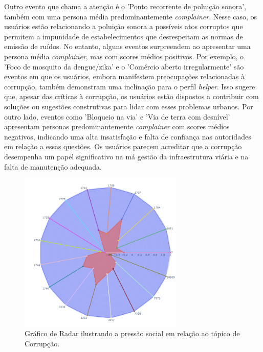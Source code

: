 Outro evento que chama a atenção é o 'Ponto recorrente de poluição sonora', também com uma persona média predominantemente \textit{complainer}. Nesse caso, os usuários estão relacionando a poluição sonora a possíveis atos corruptos que permitem a impunidade de estabelecimentos que desrespeitam as normas de emissão de ruídos. No entanto, alguns eventos surpreendem ao apresentar uma persona média \textit{complainer}, mas com scores médios positivos. Por exemplo, o 'Foco de mosquito da dengue/zika' e o 'Comércio aberto irregularmente' são eventos em que os usuários, embora manifestem preocupações relacionadas à corrupção, também demonstram uma inclinação para o perfil \textit{helper}. Isso sugere que, apesar das críticas à corrupção, os usuários estão dispostos a contribuir com soluções ou sugestões construtivas para lidar com esses problemas urbanos. Por outro lado, eventos como 'Bloqueio na via' e 'Via de terra com desnível' apresentam personas predominantemente \textit{complainer} com scores médios negativos, indicando uma alta insatisfação e falta de confiança nas autoridades em relação a essas questões. Os usuários parecem acreditar que a corrupção desempenha um papel significativo na má gestão da infraestrutura viária e na falta de manutenção adequada.

\begin{figure}[htb]
	\centering
	\includegraphics[width=0.7\textwidth]{images/social_barometer_corruption.png}
	\caption{Gráfico de Radar ilustrando a pressão social em relação ao tópico de Corrupção.}
	\label{fig:social_barometer_corruption}
\end{figure}

